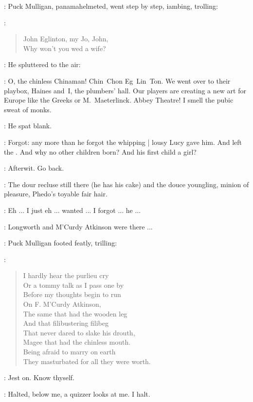 :
Puck Mulligan,
panamahelmeted,
went step by step,
iambing,
trolling:

\mulligan:
\begin{verse}
    John Eglinton, my Jo, John, \\
    Why won't you wed a wife?
\end{verse}

:
He spluttered to the air:

\mulligan:
O, the chinless Chinaman!
Chin~Chon Eg~Lin~Ton.
We went over to their playbox,
Haines and~I,
the plumbers' hall.
Our players are creating a new art for Europe
like the Greeks or M.~Maeterlinck.
Abbey Theatre!
I smell the pubic sweat of monks.

:
He spat blank.

\StephenInt:
Forgot:
any more than he forgot the whipping |
lousy Lucy gave him.
And left the .
And why no other children born?
And his first child a girl?

\StephenInt:
Afterwit.
Go back.

\StephenInt:
The dour recluse still there (he has his cake)
and the douce youngling,
minion of pleasure,
Phedo's toyable fair hair.

\StephenInt:
Eh ...
I just eh ...
wanted ...
I forgot ...
he ...

\mulligan:
Longworth and M'Curdy Atkinson were there ...

:
Puck Mulligan footed featly,
trilling:

\mulligan:
\begin{verse}
    I hardly hear the purlieu cry \\
    Or a tommy talk as I pass one by \\
    Before my thoughts begin to run \\
    On F. M'Curdy Atkinson, \\
    The same that had the wooden leg \\
    And that filibustering filibeg \\
    That never dared to slake his drouth, \\
    Magee that had the chinless mouth.
 \\
    Being afraid to marry on earth \\
    They masturbated for all they were worth.
\end{verse}

\StephenInt:
Jest on.
Know thyself.

\StephenInt:
Halted,
below me,
a quizzer looks at me.
I halt.

